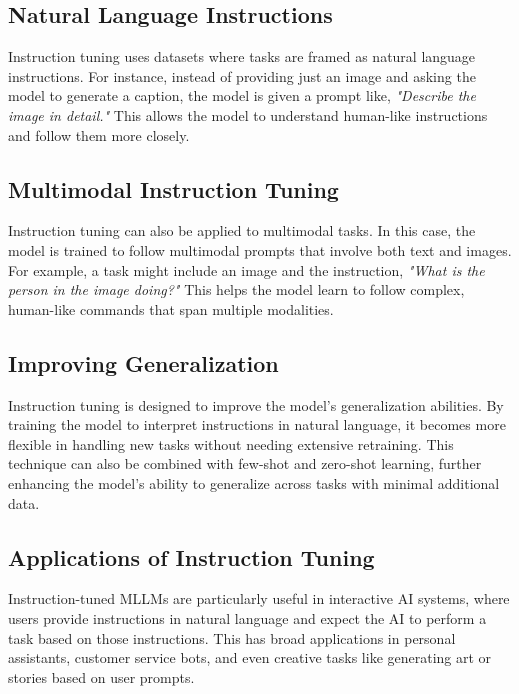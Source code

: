 \subsection{Natural Language Instructions}

Instruction tuning uses datasets where tasks are framed as natural language instructions. For instance, instead of providing just an image and asking the model to generate a caption, the model is given a prompt like, \textit{"Describe the image in detail."} This allows the model to understand human-like instructions and follow them more closely.

\subsection{Multimodal Instruction Tuning}

Instruction tuning can also be applied to multimodal tasks. In this case, the model is trained to follow multimodal prompts that involve both text and images. For example, a task might include an image and the instruction, \textit{"What is the person in the image doing?"} This helps the model learn to follow complex, human-like commands that span multiple modalities.

\subsection{Improving Generalization}

Instruction tuning is designed to improve the model’s generalization abilities. By training the model to interpret instructions in natural language, it becomes more flexible in handling new tasks without needing extensive retraining. This technique can also be combined with few-shot and zero-shot learning, further enhancing the model’s ability to generalize across tasks with minimal additional data.

\subsection{Applications of Instruction Tuning}

Instruction-tuned MLLMs are particularly useful in interactive AI systems, where users provide instructions in natural language and expect the AI to perform a task based on those instructions. This has broad applications in personal assistants, customer service bots, and even creative tasks like generating art or stories based on user prompts.

